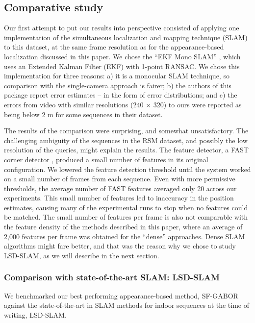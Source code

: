 \subsection{Comparative study}

Our first attempt to put our results into perspective consisted of applying one implementation of the simultaneous localization and mapping technique (SLAM) to this dataset, at the same frame resolution as for the appearance-based  localization discussed in this paper. We chose the ``EKF Mono SLAM'' \citep{Civera}, which uses an Extended Kalman Filter (EKF) with 1-point RANSAC.  We chose this implementation for three reasons: a) it is a monocular SLAM technique, so comparison with the single-camera approach is fairer; b) the authors of this package report error estimates -- in the form of error distributions; and c) the errors from video with similar resolutions (240 $\times$ 320) to ours were reported as being below 2 m for some sequences \citep{Civera} in their dataset.

The results of the comparison were surprising, and somewhat unsatisfactory. The challenging ambiguity of the sequences in the RSM dataset, and possibly the low resolution of the queries, might explain the results. The feature detector, a FAST corner detector \citep{rosten_2006_machine}, produced a small number of features in its original  configuration. We lowered the feature detection threshold until the system worked on a small number of frames from each sequence. Even with more permissive thresholds, the average number of FAST features averaged only 20 across our experiments. This small number of features led to inaccuracy in the position estimates, causing many of the experimental runs to stop when no features could be matched. The small number of features per frame is also not comparable with the feature density of the methods described in this paper, where an average of 2,000 features per frame was obtained for the ``dense'' approaches. Dense SLAM algorithms might fare better, and that was the reason why we chose to study LSD-SLAM, as we will describe in the next section.

\subsubsection{Comparison with state-of-the-art SLAM: LSD-SLAM}


We benchmarked our best performing appearance-based method, SF-GABOR against the state-of-the-art in SLAM methods for indoor sequences at the time of writing, LSD-SLAM.

